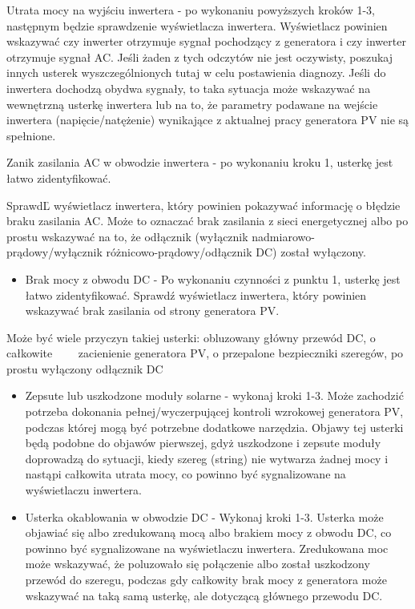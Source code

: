 \documentclass[12pt,a4paper]{article}
\begin{document}
 

Utrata mocy na wyjściu inwertera - po wykonaniu powyższych kroków 1-3, 
następnym będzie sprawdzenie wyświetlacza inwertera. Wyświetlacz 
powinien wskazywać czy inwerter otrzymuje sygnał pochodzący z generatora 
i czy inwerter otrzymuje sygnał AC. Jeśli żaden z tych odczytów nie jest 
oczywisty, poszukaj innych usterek wyszczególnionych tutaj w celu 
postawienia diagnozy. Jeśli do inwertera dochodzą obydwa sygnały, to 
taka sytuacja może wskazywać na wewnętrzną usterkę inwertera lub na to, 
że parametry podawane na wejście inwertera (napięcie/natężenie) 
wynikające z aktualnej pracy generatora PV nie są spełnione. 

 

Zanik zasilania AC w obwodzie inwertera - po wykonaniu kroku 1, usterkę 
jest łatwo zidentyfikować. 

SprawdĽ wyświetlacz inwertera, który powinien pokazywać informację o 
błędzie braku zasilania AC. Może to oznaczać brak zasilania z sieci 
energetycznej albo po prostu wskazywać na to, że odłącznik (wyłącznik 
nadmiarowo-prądowy/wyłącznik różnicowo-prądowy/odłącznik DC) został 
wyłączony. 

\begin{itemize}
\item Brak mocy z obwodu DC - Po wykonaniu czynności z punktu 1, usterkę 
jest łatwo zidentyfikować. Sprawdź wyświetlacz inwertera, który powinien 
wskazywać brak zasilania od strony generatora PV. 
\end{itemize}
Może być wiele przyczyn takiej usterki: obluzowany główny przewód DC, o 
całkowite \ \ \ \ zacienienie generatora PV, o przepalone bezpieczniki 
szeregów, po prostu wyłączony odłącznik DC 

\begin{itemize}
\item Zepsute lub uszkodzone moduły solarne - wykonaj kroki 1-3. Może 
zachodzić potrzeba dokonania pełnej/wyczerpującej kontroli wzrokowej 
generatora PV, podczas której mogą być potrzebne dodatkowe narzędzia. 
Objawy tej usterki będą podobne do objawów pierwszej, gdyż uszkodzone i 
zepsute moduły doprowadzą do sytuacji, kiedy szereg (string) nie 
wytwarza żadnej mocy i nastąpi całkowita utrata mocy, co powinno być 
sygnalizowane na wyświetlaczu inwertera. 
\item Usterka okablowania w obwodzie DC - Wykonaj kroki 1-3. Usterka 
może objawiać się albo zredukowaną mocą albo brakiem mocy z obwodu DC, 
co powinno być sygnalizowane na wyświetlaczu inwertera. Zredukowana moc 
może wskazywać, że poluzowało się połączenie albo został uszkodzony 
przewód do szeregu, podczas gdy całkowity brak mocy z generatora może 
wskazywać na taką samą usterkę, ale dotyczącą głównego przewodu DC. 
\end{itemize}
 
\end{document}
